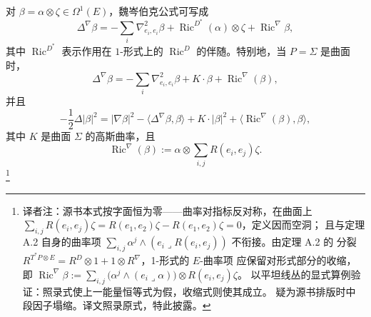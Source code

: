 \begin{corollary}
\label{cor:app-a-one-form-weizenbock}
对 $\beta=\alpha\otimes\zeta\in\Omega^1(E)$，魏岑伯克公式可写成
\[
 \Delta^\nabla\beta
 =-\sum_i\nabla^2_{e_i,e_i}\beta
  +\operatorname{Ric}^{D^*}(\alpha)\otimes\zeta
  +\operatorname{Ric}^\nabla\beta,
\]
其中 $\operatorname{Ric}^{D^*}$ 表示作用在 $1$-形式上的
$\operatorname{Ric}^D$ 的伴随。特别地，当 $P=\Sigma$ 是曲面时，
\[
 \Delta^\nabla\beta
 =-\sum_i\nabla^2_{e_i,e_i}\beta+K\cdot\beta
  +\operatorname{Ric}^\nabla(\beta),
\]
并且
\begin{equation}
\label{eq:app-a-weizenbock-energy-density}
 -\frac12\Delta|\beta|^2
 =|\nabla\beta|^2-\langle\Delta^\nabla\beta,\beta\rangle
 +K\cdot|\beta|^2
 +\langle\operatorname{Ric}^\nabla(\beta),\beta\rangle,
\end{equation}
其中 $K$ 是曲面 $\Sigma$ 的高斯曲率，且
\[
 \operatorname{Ric}^\nabla(\beta)
 :=\alpha\otimes\sum_{i,j}R(e_i,e_j)\zeta.
\]
\footnote{译者注：源书本式按字面恒为零——曲率对指标反对称，在曲面上
$\sum_{i,j}R(e_i,e_j)\zeta=R(e_1,e_2)\zeta-R(e_1,e_2)\zeta=0$，定义因而空洞；
且与定理 A.2 自身的曲率项
$\sum_{i,j}\alpha^j\wedge(e_i\lrcorner R(e_i,e_j))$ 不衔接。由定理 A.2 的
分裂 $R^{T^*P\otimes E}=R^D\otimes1+1\otimes R^\nabla$，1-形式的 $E$-曲率项
应保留对形式部分的收缩，即
$\operatorname{Ric}^\nabla\beta:=\sum_{i,j}
\bigl(\alpha^j\wedge(e_i\lrcorner\alpha)\bigr)\otimes R(e_i,e_j)\zeta$。
以平坦线丛的显式算例验证：照录式使上一能量恒等式为假，收缩式则使其成立。
疑为源书排版时中段因子塌缩。译文照录原式，特此披露。}
\end{corollary}
